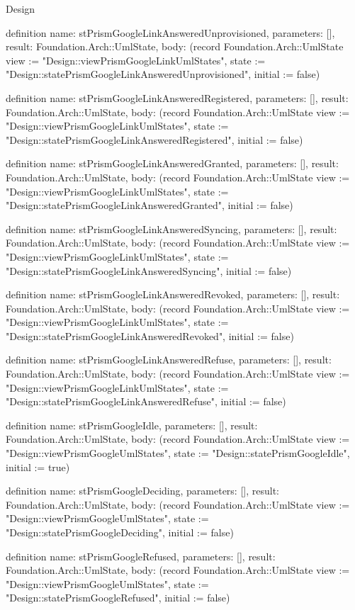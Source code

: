 \begin{lexlean}{Design}
\begin{semanticmodule}
definition{
  name: stPrismGoogleLinkAnsweredUnprovisioned,
  parameters: [],
  result: Foundation.Arch::UmlState,
  body: (record Foundation.Arch::UmlState {view := "Design::viewPrismGoogleLinkUmlStates", state := "Design::statePrismGoogleLinkAnsweredUnprovisioned", initial := false})
}

definition{
  name: stPrismGoogleLinkAnsweredRegistered,
  parameters: [],
  result: Foundation.Arch::UmlState,
  body: (record Foundation.Arch::UmlState {view := "Design::viewPrismGoogleLinkUmlStates", state := "Design::statePrismGoogleLinkAnsweredRegistered", initial := false})
}

definition{
  name: stPrismGoogleLinkAnsweredGranted,
  parameters: [],
  result: Foundation.Arch::UmlState,
  body: (record Foundation.Arch::UmlState {view := "Design::viewPrismGoogleLinkUmlStates", state := "Design::statePrismGoogleLinkAnsweredGranted", initial := false})
}

definition{
  name: stPrismGoogleLinkAnsweredSyncing,
  parameters: [],
  result: Foundation.Arch::UmlState,
  body: (record Foundation.Arch::UmlState {view := "Design::viewPrismGoogleLinkUmlStates", state := "Design::statePrismGoogleLinkAnsweredSyncing", initial := false})
}

definition{
  name: stPrismGoogleLinkAnsweredRevoked,
  parameters: [],
  result: Foundation.Arch::UmlState,
  body: (record Foundation.Arch::UmlState {view := "Design::viewPrismGoogleLinkUmlStates", state := "Design::statePrismGoogleLinkAnsweredRevoked", initial := false})
}

definition{
  name: stPrismGoogleLinkAnsweredRefuse,
  parameters: [],
  result: Foundation.Arch::UmlState,
  body: (record Foundation.Arch::UmlState {view := "Design::viewPrismGoogleLinkUmlStates", state := "Design::statePrismGoogleLinkAnsweredRefuse", initial := false})
}

definition{
  name: stPrismGoogleIdle,
  parameters: [],
  result: Foundation.Arch::UmlState,
  body: (record Foundation.Arch::UmlState {view := "Design::viewPrismGoogleUmlStates", state := "Design::statePrismGoogleIdle", initial := true})
}

definition{
  name: stPrismGoogleDeciding,
  parameters: [],
  result: Foundation.Arch::UmlState,
  body: (record Foundation.Arch::UmlState {view := "Design::viewPrismGoogleUmlStates", state := "Design::statePrismGoogleDeciding", initial := false})
}

definition{
  name: stPrismGoogleRefused,
  parameters: [],
  result: Foundation.Arch::UmlState,
  body: (record Foundation.Arch::UmlState {view := "Design::viewPrismGoogleUmlStates", state := "Design::statePrismGoogleRefused", initial := false})
}


\end{semanticmodule}
\end{lexlean}
